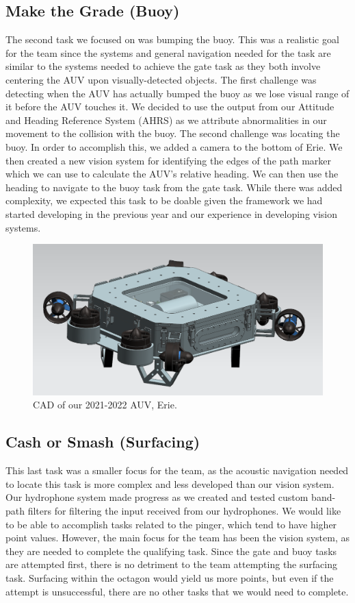\documentclass[conference]{IEEEtran}
\begin{document}
\subsection{Make the Grade (Buoy)}\label{AA}
The second task we focused on was bumping the buoy. This was a realistic goal for the team since the systems and general navigation needed for the task are similar to the systems needed to achieve the gate task as they both involve centering the AUV upon visually-detected objects. The first challenge was detecting when the AUV has actually bumped the buoy as we lose visual range of it before the AUV touches it. We decided to use the output from our Attitude and Heading Reference System (AHRS) as we attribute abnormalities in our movement to the collision with the buoy. The second challenge was locating the buoy. In order to accomplish this, we added a camera to the bottom of Erie. We then created a new vision system for identifying the edges of the path marker which we can use to calculate the AUV's relative heading. We can then use the heading to navigate to the buoy task from the gate task. While there was added complexity, we expected this task to be doable given the framework we had started developing in the previous year and our experience in developing vision systems.

\begin{figure}[htbp]
    \centerline{\includegraphics[scale=0.35]{images/sub4.PNG}}
    \caption{CAD of our 2021-2022 AUV, Erie.}
    \label{fig:sub4}
\end{figure}

\subsection{Cash or Smash (Surfacing)}\label{AA}
This last task was a smaller focus for the team, as the acoustic navigation needed to locate this task is more complex and less developed than our vision system. Our hydrophone system made progress as we created and tested custom band-path filters for filtering the input received from our hydrophones. We would like to be able to accomplish tasks related to the pinger, which tend to have higher point values. However, the main focus for the team has been the vision system, as they are needed to complete the qualifying task. Since the gate and buoy tasks are attempted first, there is no detriment to the team attempting the surfacing task. Surfacing within the octagon would yield us more points, but even if the attempt is unsuccessful, there are no other tasks that we would need to complete.
\end{document}
